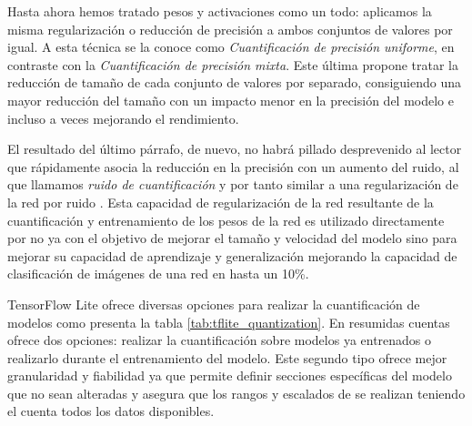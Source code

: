 Hasta ahora hemos tratado pesos y activaciones como un todo: aplicamos la misma regularización o reducción de precisión a ambos conjuntos de valores por igual. A esta técnica se la conoce como \textit{Cuantificación de precisión uniforme}, en contraste con la \textit{Cuantificación de precisión mixta}. Este última propone tratar la reducción de tamaño de cada conjunto de valores por separado, consiguiendo una mayor reducción del tamaño con un impacto menor en la precisión del modelo \cite{Jin2019} e incluso a veces mejorando el rendimiento.

El resultado del último párrafo, de nuevo, no habrá pillado desprevenido al lector que rápidamente asocia la reducción en la precisión con un aumento del ruido, al que llamamos \textit{ruido de cuantificación} y por tanto similar a una regularización de la red por ruido \cite{Bishop1995,Noh2017}. Esta capacidad de regularización de la red resultante de la cuantificación y entrenamiento de los pesos de la red es utilizado directamente por  no ya con el objetivo de mejorar el tamaño y velocidad del modelo sino para mejorar su capacidad de aprendizaje y generalización mejorando la capacidad de clasificación de imágenes de una red en hasta un 10\%.

TensorFlow Lite ofrece diversas opciones para realizar la cuantificación de modelos como presenta la tabla \ref{tab:tflite_quantization}. En resumidas cuentas ofrece dos opciones: realizar la cuantificación sobre modelos ya entrenados o realizarlo durante el entrenamiento del modelo. Este segundo tipo ofrece mejor granularidad y fiabilidad ya que permite definir secciones específicas del modelo que no sean alteradas y asegura que los rangos y escalados de se realizan teniendo el cuenta todos los datos disponibles.



